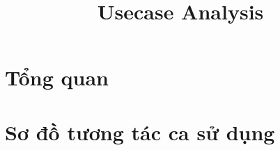 \documentclass[12pt, a4paper]{article}
\title{Usecase Analysis}
\begin{document}
	
	
	\clearpage
	
	
	\clearpage
	
	\tableofcontents 
	\clearpage
	
	
	
	
	 
	
	
	
	\section{Tổng quan}
	
	
	\section{Sơ đồ tương tác ca sử dụng}
	
	
	
	
	\clearpage
	\glsaddall
	\printglossary[title={Giải thích thuật ngữ}]

	
\end{document}
